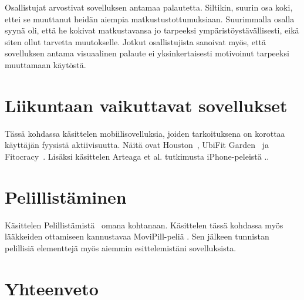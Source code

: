 \documentclass[finnish]{tktltiki2}
\theoremstyle{definition}
\theoremstyle{remark}
\begin{document}
Osallistujat arvostivat sovelluksen antamaa palautetta. Siltikin, suurin osa koki, ettei se muuttanut heidän aiempia matkustustottumuksiaan. Suurimmalla osalla syynä oli, että he kokivat matkustavansa jo tarpeeksi ympäristöystävällisesti, eikä siten ollut tarvetta muutokselle. Jotkut osallistujista sanoivat myös, että sovelluksen antama visuaalinen palaute ei yksinkertaisesti motivoinut tarpeeksi muuttamaan käytöstä.

\section{Liikuntaan vaikuttavat sovellukset}

Tässä kohdassa käsittelen mobiilisovelluksia, joiden tarkoituksena on korottaa käyttäjän fyysistä aktiivisuutta. Näitä ovat Houston~\cite{houston}, UbiFit Garden~\cite{ubifit} ja Fitocracy~\cite{fitocracy}. Lisäksi käsittelen Arteaga et al. tutkimusta iPhone-peleistä \cite{obesity}..

\section{Pelillistäminen}

Käsittelen Pelillistämistä~\cite{gamification} omana kohtanaan. Käsittelen tässä kohdassa myös lääkkeiden ottamiseen kannustavaa MoviPill-peliä \cite{movipill}.
Sen jälkeen tunnistan pelillisiä elementtejä myös aiemmin esittelemistäni sovelluksista.

\section{Yhteenveto}

%
%
% 
%







% 
\end{document}
